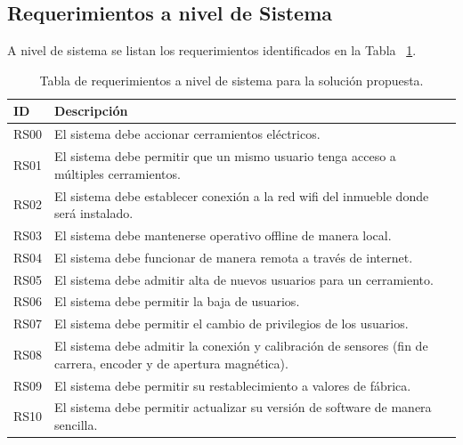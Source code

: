 \subsection{Requerimientos a nivel de Sistema}
A nivel de sistema se listan los requerimientos identificados en la Tabla ~\ref{table:req_sistemas}.
\begin{table}[ht]
		\begin{tabular}{|l|m{12cm}|}
			\hline
			\textbf{ID} & \textbf{Descripción}                                                                                             \\ \hline
			RS00        & El sistema debe accionar cerramientos eléctricos.                                                                \\ \hline
			RS01        & El sistema debe permitir que un mismo usuario tenga acceso a múltiples cerramientos.                             \\ \hline
			RS02        & El sistema debe establecer conexión a la red wifi del inmueble donde será instalado.                             \\ \hline
			RS03        & El sistema debe mantenerse operativo offline de manera local.                                                    \\ \hline
			RS04        & El sistema debe funcionar de manera remota a través de internet.                                                 \\ \hline
			RS05        & El sistema debe admitir alta de nuevos usuarios para un cerramiento.                                             \\ \hline
			RS06        & El sistema debe permitir la baja de usuarios.                                                                    \\ \hline
			RS07        & El sistema debe permitir el cambio de privilegios de los usuarios.                                               \\ \hline
			RS08        & El sistema debe admitir la conexión y calibración de sensores (fin de carrera, encoder y de apertura magnética). \\ \hline
			RS09        & El sistema debe permitir su restablecimiento a valores de fábrica.                                               \\ \hline
			RS10        & El sistema debe permitir actualizar su versión de software de manera sencilla.                                   \\ \hline
		\end{tabular}
	\caption[Requerimientos de Sistema]{Tabla de requerimientos a nivel de sistema para la solución propuesta.}
	\label{table:req_sistemas}
\end{table}
